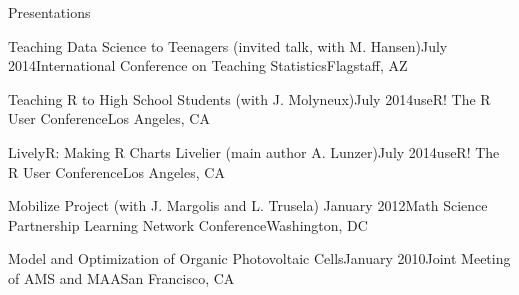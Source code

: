 \documentclass{resume} %
\begin{document}
\begin{rSection}{Presentations}
\begin{sSubsection}{Teaching Data Science to Teenagers}{ (invited talk, with M. Hansen)}{July 2014}{International Conference on Teaching Statistics}{Flagstaff, AZ}
\end{sSubsection}

\begin{sSubsection}{Teaching R to High School Students}{ (with J. Molyneux)}{July 2014}{useR! The R User Conference}{Los Angeles, CA}
\end{sSubsection}

\begin{sSubsection}{LivelyR: Making R Charts Livelier}{ (main author A. Lunzer)}{July 2014}{useR! The R User Conference}{Los Angeles, CA}
\end{sSubsection}

\begin{sSubsection}{Mobilize Project}{ (with J. Margolis and L. Trusela)} {January 2012}{Math Science Partnership Learning Network Conference}{Washington, DC}
\end{sSubsection}

\begin{sSubsection}{Model and Optimization of Organic Photovoltaic Cells}{}{January 2010}{Joint Meeting of AMS and MAA}{San Francisco, CA}
\end{sSubsection}
\end{rSection}
\end{document}
